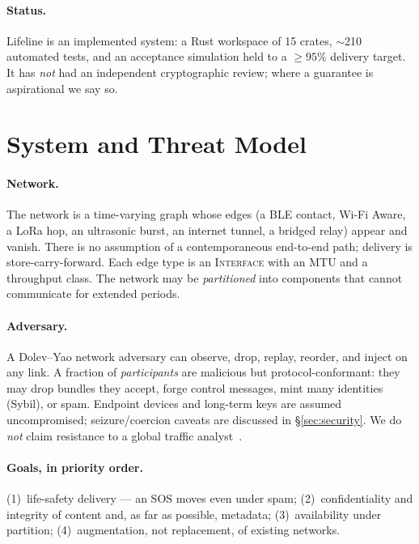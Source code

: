 \documentclass[11pt]{article}
\begin{document}
\paragraph{Status.} Lifeline is an implemented system: a Rust workspace of 15
crates, $\sim$210 automated tests, and an acceptance simulation held to a
$\geq 95\%$ delivery target. It has \emph{not} had an independent cryptographic
review; where a guarantee is aspirational we say so.

\section{System and Threat Model}\label{sec:model}

\paragraph{Network.} The network is a time-varying graph whose edges (a BLE
contact, Wi-Fi Aware, a LoRa hop, an ultrasonic burst, an internet tunnel, a
bridged relay) appear and vanish. There is no assumption of a contemporaneous
end-to-end path; delivery is store-carry-forward. Each edge type is an
\textsc{Interface} with an MTU and a throughput class. The network may be
\emph{partitioned} into components that cannot communicate for extended periods.

\paragraph{Adversary.} A Dolev--Yao network adversary can observe, drop, replay,
reorder, and inject on any link. A fraction of \emph{participants} are malicious
but protocol-conformant: they may drop bundles they accept, forge control
messages, mint many identities (Sybil), or spam. Endpoint devices and long-term
keys are assumed uncompromised; seizure/coercion caveats are discussed in
\S\ref{sec:security}. We do \emph{not} claim resistance to a global traffic
analyst~\cite{vandenhooff2015vuvuzela,piotrowska2017loopix}.

\paragraph{Goals, in priority order.} (1)~life-safety delivery --- an SOS moves
even under spam; (2)~confidentiality and integrity of content and, as far as
possible, metadata; (3)~availability under partition; (4)~augmentation, not
replacement, of existing networks.
\end{document}

